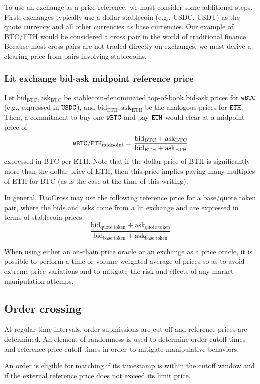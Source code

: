 \documentclass[11pt, reqno]{amsart}
\newcommand{\bidbtc}{\mathrm{bid}_\mathrm{BTC}}
\newcommand{\askbtc}{\mathrm{ask}_\mathrm{BTC}}
\newcommand{\bideth}{\mathrm{bid}_\mathrm{ETH}}
\newcommand{\asketh}{\mathrm{ask}_\mathrm{ETH}}
\newcommand{\bidbase}{\mathrm{bid}_\mathrm{quote\;token}}
\newcommand{\askbase}{\mathrm{ask}_\mathrm{quote\;token}}
\newcommand{\bidquote}{\mathrm{bid}_\mathrm{base\;token}}
\newcommand{\askquote}{\mathrm{ask}_\mathrm{base\;token}}
\newcommand{\BTC}{\textnormal{\texttt{wBTC}}}
\newcommand{\ETH}{\textnormal{\texttt{ETH}}}
\newcommand{\USDC}{\textnormal{\texttt{USDC}}}
\newcommand{\midpoint}{\mathrm{midpoint}}
\begin{document}
To use an exchange as a price reference, we must consider some additional
steps. First, exchanges typically use a dollar stablecoin (e.g., USDC, USDT) as
the quote currency and all other currencies as base currencies. Our example
of BTC/ETH would be considered a cross pair in the world of traditional
finance. Because most cross pairs are not traded directly on exchanges, we
must derive a clearing price from pairs involving stablecoins.

\subsubsection{Lit exchange bid-ask midpoint reference price}
Let $\bidbtc, \askbtc$ be stablecoin-denominated top-of-book bid-ask prices
for $\BTC$ (e.g., expressed in $\USDC$), and $\bideth, \asketh$ be the analogous
prices for $\ETH$. Then, a commitment to buy one $\BTC$ and pay $\ETH$ would
clear at a midpoint price of
\[
	\BTC/\ETH_{\midpoint} = \frac{\bidbtc + \askbtc}{\bideth + \asketh}
\]
expressed in BTC per ETH. Note that if the dollar price of BTH is significantly
more than the dollar price of ETH, then this price implies paying many
multiples of ETH for BTC (as is the case at the time of this writing).

In general, DaoCross may use the following reference price for a base/quote
token pair, where the bids and asks come from a lit exchange and are expressed
in terms of stablecoin prices:
\begin{equation}
	\frac{\bidbase + \askbase}{\bidquote + \askquote}
\end{equation}

When using either an on-chain price oracle or an exchange as a price oracle,
it is possible to perform a time or volume weighted average of prices so as
to avoid extreme price variations and to mitigate the risk and effects of any
market manipulation attemps.

\subsection{Order crossing}
At regular time intervals, order submissions are cut off and reference prices
are determined. An element of randomness is used to determine order cutoff
times and reference price cutoff times in order to
mitigate manipulative behaviors.

An order is eligible for matching if its timestamp is within the cutoff window
and if the external reference price does not exceed its limit price.
\end{document}
